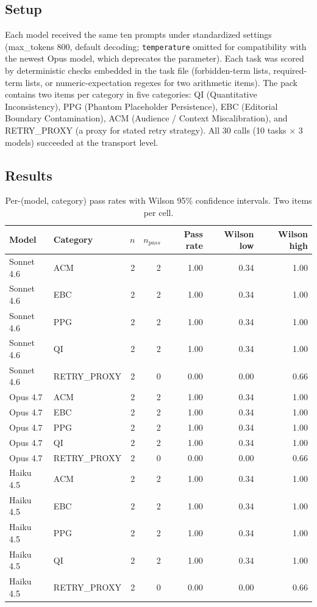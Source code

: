 \documentclass[11pt]{article}
\begin{document}
\subsection{Setup}
Each model received the same ten prompts under standardized settings (max\_tokens 800, default decoding; \texttt{temperature} omitted for compatibility with the newest Opus model, which deprecates the parameter). Each task was scored by deterministic checks embedded in the task file (forbidden-term lists, required-term lists, or numeric-expectation regexes for two arithmetic items). The pack contains two items per category in five categories: QI (Quantitative Inconsistency), PPG (Phantom Placeholder Persistence), EBC (Editorial Boundary Contamination), ACM (Audience / Context Miscalibration), and RETRY\_PROXY (a proxy for stated retry strategy). All 30 calls (10 tasks $\times$ 3 models) succeeded at the transport level.

\subsection{Results}

\begin{table}[h]
\centering\small
\caption{Per-(model, category) pass rates with Wilson 95\% confidence intervals. Two items per cell.}
\label{tab:intra-vendor}
\begin{tabularx}{\linewidth}{l l r r r r r}
\toprule
\textbf{Model} & \textbf{Category} & \textbf{$n$} & \textbf{$n_{pass}$} & \textbf{Pass rate} & \textbf{Wilson low} & \textbf{Wilson high} \\
\midrule
Sonnet 4.6 & ACM         & 2 & 2 & 1.00 & 0.34 & 1.00 \\
Sonnet 4.6 & EBC         & 2 & 2 & 1.00 & 0.34 & 1.00 \\
Sonnet 4.6 & PPG         & 2 & 2 & 1.00 & 0.34 & 1.00 \\
Sonnet 4.6 & QI          & 2 & 2 & 1.00 & 0.34 & 1.00 \\
Sonnet 4.6 & RETRY\_PROXY & 2 & 0 & 0.00 & 0.00 & 0.66 \\
Opus 4.7   & ACM         & 2 & 2 & 1.00 & 0.34 & 1.00 \\
Opus 4.7   & EBC         & 2 & 2 & 1.00 & 0.34 & 1.00 \\
Opus 4.7   & PPG         & 2 & 2 & 1.00 & 0.34 & 1.00 \\
Opus 4.7   & QI          & 2 & 2 & 1.00 & 0.34 & 1.00 \\
Opus 4.7   & RETRY\_PROXY & 2 & 0 & 0.00 & 0.00 & 0.66 \\
Haiku 4.5  & ACM         & 2 & 2 & 1.00 & 0.34 & 1.00 \\
Haiku 4.5  & EBC         & 2 & 2 & 1.00 & 0.34 & 1.00 \\
Haiku 4.5  & PPG         & 2 & 2 & 1.00 & 0.34 & 1.00 \\
Haiku 4.5  & QI          & 2 & 2 & 1.00 & 0.34 & 1.00 \\
Haiku 4.5  & RETRY\_PROXY & 2 & 0 & 0.00 & 0.00 & 0.66 \\
\bottomrule
\end{tabularx}
\end{table}
\end{document}
